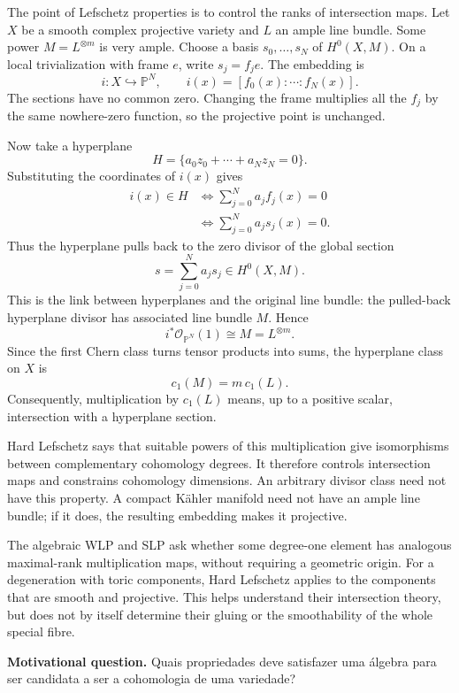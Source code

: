 \begin{remark}
\label{remark-geometric-meaning}
The point of Lefschetz properties is to
control the ranks of intersection maps.
Let $X$ be a smooth complex projective
variety and $L$ an ample line bundle.
Some power $M=L^{\otimes m}$ is very
ample. Choose a basis
$s_0,\ldots,s_N$ of $H^0(X,M)$.
On a local trivialization with frame $e$,
write $s_j=f_j e$. The embedding is
$$
i:X\hookrightarrow\mathbb{P}^N,
\qquad
i(x)=[f_0(x):\cdots:f_N(x)].
$$
The sections have no common zero.
Changing the frame multiplies all the
$f_j$ by the same nowhere-zero function,
so the projective point is unchanged.

Now take a hyperplane
$$
H=\{a_0z_0+\cdots+a_Nz_N=0\}.
$$
Substituting the coordinates of $i(x)$
gives
$$
\begin{aligned}
i(x)\in H
&\Longleftrightarrow
\sum_{j=0}^N a_j f_j(x)=0\\
&\Longleftrightarrow
\sum_{j=0}^N a_j s_j(x)=0.
\end{aligned}
$$
Thus the hyperplane pulls back to the
zero divisor of the global section
$$
s=\sum_{j=0}^N a_j s_j\in H^0(X,M).
$$
This is the link between hyperplanes and
the original line bundle: the pulled-back
hyperplane divisor has associated line
bundle $M$. Hence
$$
i^*\mathcal{O}_{\mathbb{P}^N}(1)
\cong M=L^{\otimes m}.
$$
Since the first Chern class turns tensor
products into sums, the hyperplane class
on $X$ is
$$
c_1(M)=m\,c_1(L).
$$
Consequently, multiplication by $c_1(L)$
means, up to a positive scalar,
intersection with a hyperplane section.

Hard Lefschetz says that suitable powers
of this multiplication give isomorphisms
between complementary cohomology degrees.
It therefore controls intersection maps
and constrains cohomology dimensions.
An arbitrary divisor class need not
have this property.
A compact Kähler manifold need not have
an ample line bundle; if it does,
the resulting embedding makes it
projective.

The algebraic WLP and SLP ask whether
some degree-one element has analogous
maximal-rank multiplication maps,
without requiring a geometric origin.
For a degeneration with toric components,
Hard Lefschetz applies to the components
that are smooth and projective.
This helps understand their intersection
theory, but does not by itself determine
their gluing or the smoothability of the
whole special fibre.
\end{remark}

\medskip\noindent
\textbf{Motivational question.}
Quais propriedades deve satisfazer uma
álgebra para ser candidata a ser a
cohomologia de uma variedade?

